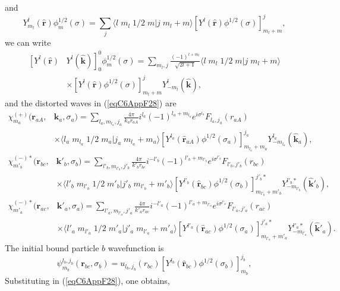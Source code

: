 and
 \begin{equation}\label{eqC6AppG31}
 Y^{l}_{m_l} (\hat {\mathbf{r}})\phi^{1/2}_m(\sigma)=\sum_j \langle l\;m_l\;1/2\;m|j\;m_l+m\rangle \left[ Y^{l} (\hat {\mathbf{r}})\phi^{1/2}(\sigma)\right]^j_{m_l+m},
\end{equation}
we can write
 \begin{equation}\label{eqC6AppG32}
 \begin{split}
\left[ Y^{l} (\hat {\mathbf{r}}) \right. & \left. Y^{l} (\hat {\mathbf{k}})\right]^0_0\phi^{1/2}_m(\sigma)=\sum_{m_l,j} \frac{(-1)^{l+m_l}}{\sqrt{2l+1}} \langle l\;m_l\;1/2\;m|j\;m_l+m\rangle \\
&\times \left[ Y^{l} (\hat {\mathbf{r}})\phi^{1/2}(\sigma)\right]^j_{m_l+m}Y^{l}_{-m_l} (\hat {\mathbf{k}}),
 \end{split}
\end{equation}
and the distorted waves in (\ref{eqC6AppF28}) are
 \begin{equation}\label{eq33}
\begin{split} 
\chi^{(+)}_{m_a}(\mathbf{r}_{aA},&\mathbf{k}_{a},\sigma_a)= \sum_{l_a,m_{l_a},j_a}\frac{4\pi}{k_a r_{aA}} i^{l_a}(-1)^{l_a+m_{l_a}}
e^{i\sigma^{l_a}} F_{l_a,j_a}(r_{aA})\\
 &\times\langle l_a\;m_{l_a}\;1/2\;m_a|j_a\;m_{l_a}+m_a\rangle
 \left[ Y^{l_a} (\hat {\mathbf{r}}_{aA})\phi^{1/2}(\sigma_a)\right]^{j_a}_{m_{l_a}+m_a}Y^{l_a}_{-m_{l_a}} (\hat {\mathbf{k}}_a),
\end{split} 
\end{equation}
 \begin{equation}\label{eqC6AppF34}
\begin{split} 
\chi^{(-)*}_{m'_b}(\mathbf{r}_{bc},&\mathbf{k}'_{b},\sigma_b)= \sum_{l'_b,m_{l'_b},j'_b}\frac{4\pi}{k'_b r_{bc}} i^{-l'_b}(-1)^{l'_b+m_{l'_b}}
e^{i\sigma^{l'_b}} F_{l'_b,j'_b}(r_{bc})\\
 &\times\langle l'_b\;m_{l'_b}\;1/2\;m'_b|j'_b\;m_{l'_b}+m'_b\rangle
 \left[ Y^{l'_b} (\hat {\mathbf{r}}_{bc})\phi^{1/2}(\sigma_b)\right]^{j'_b*}_{m_{l'_b}+m'_b}Y^{l'_b*}_{-m_{l'_b}} (\hat {\mathbf{k}}'_b),
\end{split} 
\end{equation}
 \begin{equation}\label{eqC6AppG35}
\begin{split} 
\chi^{(-)*}_{m'_a}(\mathbf{r}_{ac},&\mathbf{k}'_{a},\sigma_a)= \sum_{l'_a,m_{l'_a},j'_a}\frac{4\pi}{k'_a r_{ac}} i^{-l'_a}(-1)^{l'_a+m_{l'_a}}
e^{i\sigma^{l'_a}} F_{l'_a,j'_a}(r_{ac})\\
 &\times\langle l'_a\;m_{l'_a}\;1/2\;m'_a|j'_a\;m_{l'_a}+m'_a\rangle
 \left[ Y^{l'_a} (\hat {\mathbf{r}}_{ac})\phi^{1/2}(\sigma_a)\right]^{j'_a*}_{m_{l'_a}+m'_a}Y^{l'_a*}_{-m_{l'_a}} (\hat {\mathbf{k}}'_a).
\end{split} 
\end{equation}
The initial bound particle $b$ wavefunction	  is
 \begin{equation}\label{eqC6AppG36}
\psi_{m_b}^{l_b,j_b}(\mathbf{r}_{bc},\sigma_b)=u_{l_b,j_b}(r_{bc})\left[ Y^{l_b} (\hat {\mathbf{r}}_{bc})\phi^{1/2}(\sigma_b)\right]^{j_b}_{m_b},
\end{equation}
Substituting in (\ref{eqC6AppF28}), one obtains,

